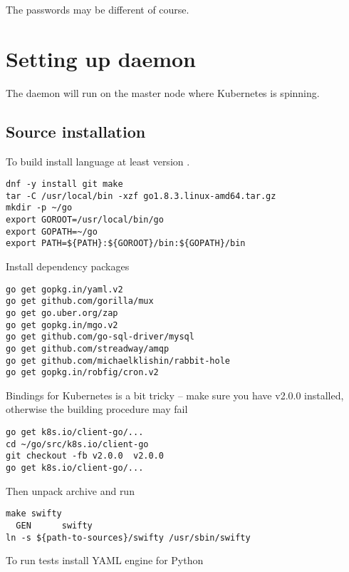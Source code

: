 The passwords may be different of course.

\section{Setting up  daemon}
\label{sec:setup-swifty}

The  daemon will run on the master node
where Kubernetes is spinning.

\subsection{Source installation}
\label{subsec:setup-swifty-src}

To build  install 
language at least version
.

\begin{lstlisting}
dnf -y install git make
tar -C /usr/local/bin -xzf go1.8.3.linux-amd64.tar.gz
mkdir -p ~/go
export GOROOT=/usr/local/bin/go
export GOPATH=~/go
export PATH=${PATH}:${GOROOT}/bin:${GOPATH}/bin
\end{lstlisting}

Install dependency packages

\begin{lstlisting}
go get gopkg.in/yaml.v2
go get github.com/gorilla/mux
go get go.uber.org/zap
go get gopkg.in/mgo.v2
go get github.com/go-sql-driver/mysql
go get github.com/streadway/amqp
go get github.com/michaelklishin/rabbit-hole
go get gopkg.in/robfig/cron.v2
\end{lstlisting}

Bindings for Kubernetes is a bit tricky -- make sure you have v2.0.0 installed,
otherwise the building procedure may fail

\begin{lstlisting}
go get k8s.io/client-go/...
cd ~/go/src/k8s.io/client-go
git checkout -fb v2.0.0  v2.0.0
go get k8s.io/client-go/...
\end{lstlisting}

Then unpack  archive and run

\begin{lstlisting}
make swifty
  GEN      swifty
ln -s ${path-to-sources}/swifty /usr/sbin/swifty
\end{lstlisting}

To run tests install YAML engine for Python

